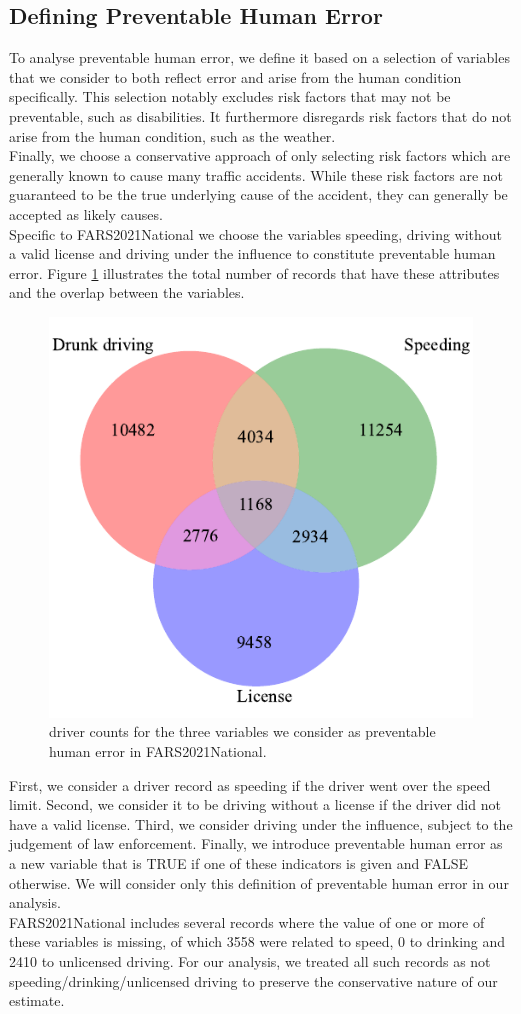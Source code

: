 \documentclass{article}
\theoremstyle{plain}
\theoremstyle{definition}
\theoremstyle{remark}
\begin{document}
\subsection{Defining Preventable Human Error}
To analyse preventable human error, we define it based on a selection of variables that we consider to both reflect error and arise from the human condition specifically. This selection notably excludes risk factors that may not be preventable, such as disabilities. It furthermore disregards risk factors that do not arise from the human condition, such as the weather.\\
Finally, we choose a conservative approach of only selecting risk factors which are generally known to cause many traffic accidents. While these risk factors are not guaranteed to be the true underlying cause of the accident, they can generally be accepted as likely causes.
\\
Specific to FARS2021National we choose the variables speeding, driving without a valid license and driving under the influence to constitute preventable human error. Figure \ref{fig:drivers-err-overlap} illustrates the total number of records that have these attributes and the overlap between the variables.

\begin{figure}[ht]
	\vskip 0.2in
	\begin{center}
		\centerline{\includegraphics[width=0.49\columnwidth]{plots/drivers-err-overlap}}
		\caption{driver counts for the three variables we consider as preventable human error in FARS2021National.}
		\label{fig:drivers-err-overlap}
	\end{center}
	\vskip -0.2in
\end{figure}

First, we consider a driver record as speeding if the driver went over the speed limit. Second, we consider it to be driving without a license if the driver did not have a valid license. Third, we consider driving under the influence, subject to the judgement of law enforcement. Finally, we introduce preventable human error as a new variable that is TRUE if one of these indicators is given and FALSE otherwise. We will consider only this definition of preventable human error in our analysis.
\\
FARS2021National includes several records where the value of one or more of these variables is missing, of which 3558 were related to speed, 0 to drinking and 2410 to unlicensed driving. For our analysis, we treated all such records as not speeding/drinking/unlicensed driving to preserve the conservative nature of our estimate.
\end{document}
